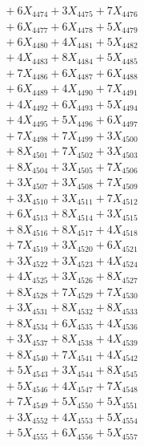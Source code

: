 \documentclass[a4paper,10pt]{article}
\begin{document}
{\begin{align}
&\;  + 6 X_{4474} + 3 X_{4475} + 7 X_{4476} \\[0.3ex]
&\;  + 6 X_{4477} + 6 X_{4478} + 5 X_{4479} \\[0.5ex]\allowbreak
&\;  + 6 X_{4480} + 4 X_{4481} + 5 X_{4482} \\[0.3ex]
&\;  + 4 X_{4483} + 8 X_{4484} + 5 X_{4485} \\[0.3ex]
&\;  + 7 X_{4486} + 6 X_{4487} + 6 X_{4488} \\[0.3ex]
&\;  + 6 X_{4489} + 4 X_{4490} + 7 X_{4491} \\[0.3ex]
&\;  + 4 X_{4492} + 6 X_{4493} + 5 X_{4494} \\[0.3ex]
&\;  + 4 X_{4495} + 5 X_{4496} + 6 X_{4497} \\[0.3ex]
&\;  + 7 X_{4498} + 7 X_{4499} + 3 X_{4500} \\[0.3ex]
&\;  + 8 X_{4501} + 7 X_{4502} + 3 X_{4503} \\[0.3ex]
&\;  + 8 X_{4504} + 3 X_{4505} + 7 X_{4506} \\[0.3ex]
&\;  + 3 X_{4507} + 3 X_{4508} + 7 X_{4509} \\[0.5ex]\allowbreak
&\;  + 3 X_{4510} + 3 X_{4511} + 7 X_{4512} \\[0.3ex]
&\;  + 6 X_{4513} + 8 X_{4514} + 3 X_{4515} \\[0.3ex]
&\;  + 8 X_{4516} + 8 X_{4517} + 4 X_{4518} \\[0.3ex]
&\;  + 7 X_{4519} + 3 X_{4520} + 6 X_{4521} \\[0.3ex]
&\;  + 3 X_{4522} + 3 X_{4523} + 4 X_{4524} \\[0.3ex]
&\;  + 4 X_{4525} + 3 X_{4526} + 8 X_{4527} \\[0.3ex]
&\;  + 8 X_{4528} + 7 X_{4529} + 7 X_{4530} \\[0.3ex]
&\;  + 3 X_{4531} + 8 X_{4532} + 8 X_{4533} \\[0.3ex]
&\;  + 8 X_{4534} + 6 X_{4535} + 4 X_{4536} \\[0.3ex]
&\;  + 3 X_{4537} + 8 X_{4538} + 4 X_{4539} \\[0.5ex]\allowbreak
&\;  + 8 X_{4540} + 7 X_{4541} + 4 X_{4542} \\[0.3ex]
&\;  + 5 X_{4543} + 3 X_{4544} + 8 X_{4545} \\[0.3ex]
&\;  + 5 X_{4546} + 4 X_{4547} + 7 X_{4548} \\[0.3ex]
&\;  + 7 X_{4549} + 5 X_{4550} + 5 X_{4551} \\[0.3ex]
&\;  + 3 X_{4552} + 4 X_{4553} + 5 X_{4554} \\[0.3ex]
&\;  + 5 X_{4555} + 6 X_{4556} + 5 X_{4557} \\[0.3ex]

\end{align}}
\end{document}
